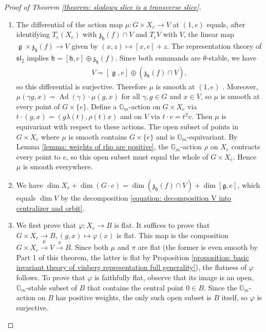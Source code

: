 \documentclass{article} %
\numberwithin{equation}{section}
\theoremstyle{definition}
\newcommand{\G}{\mathbb{G}}
\DeclareMathOperator{\lieg}{\mathfrak{g}}
\DeclareMathOperator{\Ad}{Ad}
\newcommand{\frakg}{\mathfrak g}
\newcommand{\frakh}{\mathfrak h}
\newcommand{\frakz}{\mathfrak z}
\newcommand{\fraksl}{\mathfrak{sl}}
\begin{document}
\begin{proof}[Proof of Theorem \ref{theorem: slodowy slice is a transverse slice}]
    \begin{enumerate}
        \item The differential of the action map $\mu\colon G\times X_e\rightarrow V$ at $(1,e)$ equals, after identifying $T_e(X_e)$ with $\frakz_{\frakh}(f)\cap V$ and $T_eV$ with $V$, the linear map $\lieg\times \frakz_{\frakh}(f)\rightarrow V$ given by $(x,z)\mapsto [x,e] + z$. The representation theory of $\fraksl_2$ implies $\frakh = [\frakh,e] \oplus \frakz_{\frakh}(f)$.
        Since both summands are $\theta$-stable, we have
        \begin{align}\label{equation: decomposition V into centralizer and orbit}
            V=[\lieg,e] \oplus (\frakz_{\frakh}(f)\cap V),
        \end{align}
        so this differential is surjective. 
        Therefore $\mu$ is smooth at $(1,e)$ \cite[Proposition III.10.4]{hartshorne-AGbook}.
        Moreover, $\mu(\gamma g,x) = \Ad(\gamma)\cdot \mu(g,x)$ for all $\gamma,g\in G$ and $x\in V$, so $\mu$ is smooth at every point of $G\times\{e\}$.
        Define a $\G_m$-action on $G\times X_e$ via $t\cdot (g,x) = (g\lambda(t), \rho(t)x)$ and on $V$ via $t\cdot v= t^2 v$.
        Then $\mu$ is equivariant with respect to these actions.
        The open subset of points in $G\times X_e$ where $\mu$ is smooth contains $G\times \{e\}$ and is $\G_m$-equivariant.
        By Lemma \ref{lemma: weights of rho are positive}, the $\G_m$-action $\rho$ on $X_e$ contracts every point to $e$, so this open subset must equal the whole of $G\times X_e$.
        Hence $\mu$ is smooth everywhere.
        \item We have $\dim X_e + \dim(G\cdot e) = \dim (\frakz_{\frakh}(f)\cap V) + \dim [\frakg,e]$, which equals $\dim V$ by the decomposition \eqref{equation: decomposition V into centralizer and orbit}.
        \item We first prove that $\varphi\colon X_e\rightarrow B$ is flat.
        It suffices to prove that $G\times X_e\rightarrow B, (g,x)\mapsto \varphi(x)$ is flat. This map is the composition $G\times X_e\xrightarrow{\mu} V\xrightarrow{\pi} B$. 
        Since both $\mu$ and $\pi$ are flat (the former is even smooth by Part 1 of this theorem, the latter is flat by Proposition \ref{proposition: basic invariant theory of vinberg representation full generality}), the flatness of $\varphi$ follows.
        To prove that $\varphi$ is faithfully flat, observe that its image is an open, $\G_m$-stable subset of $B$ that contains the central point $0\in B$.
        Since the $\G_m$-action on $B$ has positive weights, the only such open subset is $B$ itself, so $\varphi$ is surjective.
    \end{enumerate}
\end{proof}
\end{document}
